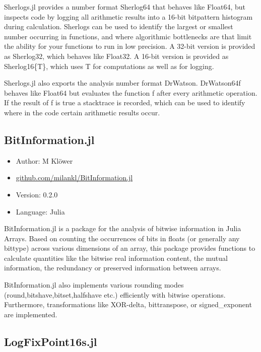 Sherlogs.jl provides a number format Sherlog64 that behaves like Float64, but inspects code by logging all arithmetic results into a 16-bit bitpattern histogram
during calculation. Sherlogs can be used to identify the largest or smallest number occurring in functions, and where algorithmic bottlenecks are that limit the
ability for your functions to run in low precision. A 32-bit version is provided as Sherlog32, which behaves like Float32. A 16-bit version is provided as Sherlog16\{T\},
which uses T for computations as well as for logging.

Sherlogs.jl also exports the analysis number format DrWatson. DrWatson64{f} behaves like Float64 but evaluates the function f after every arithmetic operation.
If the result of f is true a stacktrace is recorded, which can be used to identify where in the code certain arithmetic results occur.

\subsection{BitInformation.jl}

\begin{itemize}
    \setlength\itemsep{-5pt}
    \item Author: M Klöwer
    \item \href{https://github.com/milankl/BitInformation.jl}{github.com/milankl/BitInformation.jl}
    \item Version: 0.2.0
    \item Language: Julia
\end{itemize}

BitInformation.jl is a package for the analysis of bitwise information in Julia Arrays. Based on counting the occurrences of bits in floats (or generally any bittype)
across various dimensions of an array, this package provides functions to calculate quantities like the bitwise real information content, the mutual information,
the redundancy or preserved information between arrays.

BitInformation.jl also implements various rounding modes (round,bitshave,bitset,halfshave etc.) efficiently with bitwise operations. Furthermore, transformations like XOR-delta,
bittranspose, or signed\_exponent are implemented.

\subsection{LogFixPoint16s.jl}

